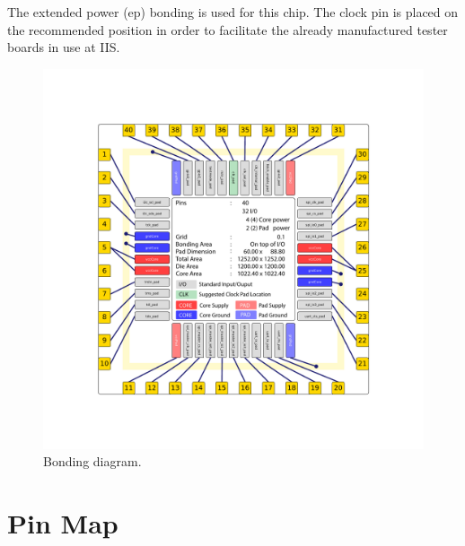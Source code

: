 The extended power (ep) bonding is used for this chip. The clock pin is placed on the recommended position in order to facilitate the already manufactured tester boards in use at IIS.

\begin{figure}[htbp]
  \centering \includegraphics[width=\textwidth]{./figures/pad_instaces_img_ord}
  \caption{Bonding diagram.}
\end{figure}

\section{Pin Map}

